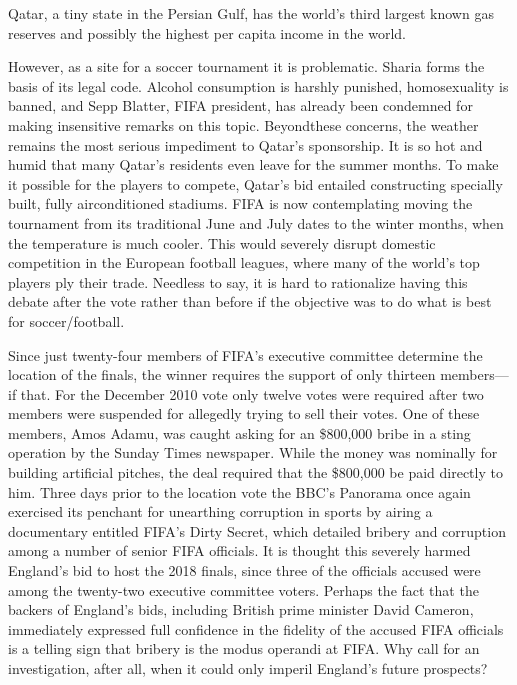\documentclass[10pt]{article}
\begin{document}
{\large Qatar, a tiny state in the Persian Gulf, has the world's third largest
known gas reserves and possibly the highest per capita income in the world.}

{\large However, as a site for a soccer tournament it is problematic. Sharia
forms the basis of its legal code. Alcohol consumption is harshly punished,
homosexuality is banned, and Sepp Blatter, FIFA president, has already been
condemned for making insensitive remarks on this topic. Beyondthese concerns, the
weather remains the most serious impediment to Qatar's sponsorship. It is so hot
and humid that many Qatar's residents even leave for the summer months. To make
it possible for the players to compete, Qatar's bid entailed constructing
specially built, fully airconditioned stadiums. FIFA is now contemplating moving
the tournament from its traditional June and July dates to the winter months,
when the temperature is much cooler. This would severely disrupt domestic
competition in the European football leagues, where many of the world's top
players ply their trade. Needless to say, it is hard to rationalize having this
debate after the vote rather than before if the objective was to do what is best
for soccer/football.}

{\large Since just twenty-four members of FIFA's executive committee determine
the location of the finals, the winner requires the support of only thirteen
members---if that. For the December 2010 vote only twelve votes were required
after two members were suspended for allegedly trying to sell their votes. One of
these members, Amos Adamu, was caught asking for an \$800,000 bribe in a sting
operation by the Sunday Times newspaper. While the money was nominally for
building artificial pitches, the deal required that the \$800,000 be paid
directly to him. Three days prior to the location vote the BBC's Panorama once
again exercised its penchant for unearthing corruption in sports by airing a
documentary entitled FIFA's Dirty Secret, which detailed bribery and corruption
among a number of senior FIFA officials. It is thought this severely harmed
England's bid to host the 2018 finals, since three of the officials accused were
among the twenty-two executive committee voters. Perhaps the fact that the
backers of England's bids, including British prime minister David Cameron,
immediately expressed full confidence in the fidelity of the accused FIFA
officials is a telling sign that bribery is the modus operandi at FIFA. Why call
for an investigation, after all, when it could only imperil England's future
prospects?}
\end{document}
